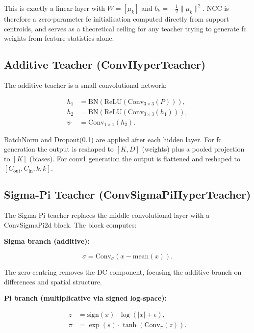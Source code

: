 \documentclass{article}
\begin{document}
This is exactly a linear layer with $W=[\mu_k]$ and $b_k=-\frac{1}{2}\|\mu_k\|^2$. NCC is therefore a zero-parameter fc initialisation computed directly from support centroids, and serves as a theoretical ceiling for any teacher trying to generate fc weights from feature statistics alone.

\subsection{Additive Teacher (ConvHyperTeacher)}\label{additive-teacher-convhyperteacher}

The additive teacher is a small convolutional network:

\begin{align*}
h_1 &= \mathrm{BN}(\mathrm{ReLU}(\mathrm{Conv}_{3\times3}(P))), \\
h_2 &= \mathrm{BN}(\mathrm{ReLU}(\mathrm{Conv}_{3\times3}(h_1))), \\
\psi &= \mathrm{Conv}_{1\times1}(h_2).
\end{align*}

BatchNorm and Dropout(0.1) are applied after each hidden layer. For fc generation the output is reshaped to $[K,D]$ (weights) plus a pooled projection to $[K]$ (biases). For conv1 generation the output is flattened and reshaped to $[C_{\mathrm{out}},C_{\mathrm{in}},k,k]$.

\subsection{Sigma-Pi Teacher (ConvSigmaPiHyperTeacher)}\label{sigma-pi-teacher-convsigmapihyperteacher}

The Sigma-Pi teacher replaces the middle convolutional layer with a ConvSigmaPi2d block. The block computes:

\textbf{Sigma branch (additive):}

\begin{equation}
\sigma = \mathrm{Conv}_{\sigma}\left(x - \mathrm{mean}(x)\right).
\end{equation}

The zero-centring removes the DC component, focusing the additive branch on differences and spatial structure.

\textbf{Pi branch (multiplicative via signed log-space):}

\begin{align}
z &= \mathrm{sign}(x)\cdot \log\left(|x| + \epsilon\right), \\
\pi &= \exp(s)\cdot \tanh\left(\mathrm{Conv}_{\pi}(z)\right).
\end{align}
\end{document}
